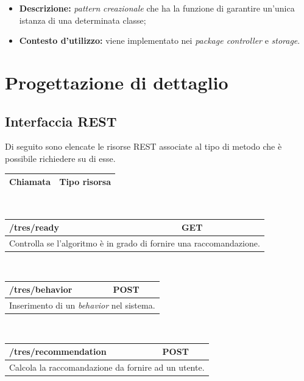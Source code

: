 \begin{itemize}
	\begin{itemize}
		\item \textbf{Descrizione:} \textit{pattern} \textit{creazionale} che ha la funzione di garantire un'unica istanza di una determinata classe;
		\item \textbf{Contesto d'utilizzo:} viene implementato nei \textit{package controller} e \textit{storage}.
	\end{itemize}
\end{itemize}

\newpage
\section{Progettazione di dettaglio}
\subsection{Interfaccia REST}
Di seguito sono elencate le risorse \gls{REST} associate al tipo di metodo che è possibile richiedere su di esse.
\begin{table}[h]
	\begin{tabular}{|p{}|p{}|}
		\toprule
		
		\textbf{Chiamata} & \textbf{Tipo risorsa}  \\
		\bottomrule
		\end{tabular}\\	
		\end{table}
		
		\begin{table}[h]
			\begin{tabular}{|p{}|p{}|}
				\toprule
				\textbf{/tres/ready} & \textbf{GET}  \\ \midrule
				\multicolumn{2}{|c|}{Controlla se l'algoritmo è in grado di fornire una raccomandazione.} \\
				\bottomrule
			\end{tabular}\\
				\par\bigskip
			
			\begin{tabular}{|p{}|p{}|}
				\toprule
				\textbf{/tres/behavior} & \textbf{POST}  \\ \midrule
				\multicolumn{2}{|c|}{Inserimento di un \textit{behavior} nel sistema.} \\
				\bottomrule
			\end{tabular}\\
				\par\bigskip
			
			\begin{tabular}{|p{}|p{}|}
				\toprule
				\textbf{/tres/recommendation} & \textbf{POST}  \\ \midrule
				\multicolumn{2}{|c|}{Calcola la raccomandazione da fornire ad un utente.} \\
				\bottomrule
			\end{tabular}\\
			\par\bigskip
		\end{table}
		
